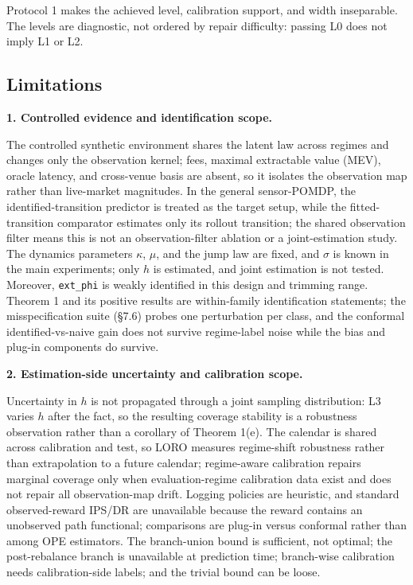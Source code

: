 Protocol 1 makes the achieved level, calibration support, and width inseparable. The levels are diagnostic, not ordered by repair difficulty: passing L0 does not imply L1 or L2.

\subsection{Limitations}

\textbf{1. Controlled evidence and identification scope.}

The controlled synthetic environment shares the latent law across regimes and changes only the observation kernel; fees, maximal extractable value (MEV), oracle latency, and cross-venue basis are absent, so it isolates the observation map rather than live-market magnitudes. In the general sensor-POMDP, the identified-transition predictor is treated as the target setup, while the fitted-transition comparator estimates only its rollout transition; the shared observation filter means this is not an observation-filter ablation or a joint-estimation study. The dynamics parameters $\kappa$, $\mu$, and the jump law are fixed, and $\sigma$ is known in the main experiments; only $h$ is estimated, and joint estimation is not tested. Moreover, \texttt{ext\_phi} is weakly identified in this design and trimming range. Theorem 1 and its positive results are within-family identification statements; the misspecification suite (\S7.6) probes one perturbation per class, and the conformal identified-vs-naive gain does not survive regime-label noise while the bias and plug-in components do survive.

\textbf{2. Estimation-side uncertainty and calibration scope.}

Uncertainty in $h$ is not propagated through a joint sampling distribution: L3 varies $h$ after the fact, so the resulting coverage stability is a robustness observation rather than a corollary of Theorem 1(e). The calendar is shared across calibration and test, so LORO measures regime-shift robustness rather than extrapolation to a future calendar; regime-aware calibration repairs marginal coverage only when evaluation-regime calibration data exist and does not repair all observation-map drift. Logging policies are heuristic, and standard observed-reward IPS/DR are unavailable because the reward contains an unobserved path functional; comparisons are plug-in versus conformal rather than among OPE estimators. The branch-union bound is sufficient, not optimal; the post-rebalance branch is unavailable at prediction time; branch-wise calibration needs calibration-side labels; and the trivial bound can be loose.

